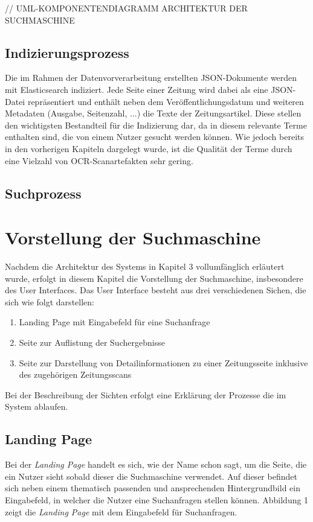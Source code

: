 \documentclass[11pt,a4paper, halfparskip]{scrartcl}
\begin{document}
// UML-KOMPONENTENDIAGRAMM ARCHITEKTUR DER SUCHMASCHINE 

\subsection{Indizierungsprozess}

Die im Rahmen der Datenvorverarbeitung erstellten JSON-Dokumente werden mit Elasticsearch indiziert. 
Jede Seite einer Zeitung wird dabei als eine JSON-Datei repräsentiert und enthält neben dem Veröffentlichungsdatum und weiteren Metadaten (Ausgabe, Seitenzahl, ...) die Texte der Zeitungsartikel.
Diese stellen den wichtigsten Bestandteil für die Indizierung dar, da in diesem relevante Terme enthalten sind, die von einem Nutzer gesucht werden können.
Wie jedoch bereits in den vorherigen Kapiteln dargelegt wurde, ist die Qualität der Terme durch eine Vielzahl von OCR-Scanartefakten sehr gering.

\subsection{Suchprozess}

\section{Vorstellung der Suchmaschine}

Nachdem die Architektur des Systems in Kapitel 3 vollumfänglich erläutert wurde, erfolgt in diesem Kapitel die Vorstellung der Suchmaschine, insbesondere des User Interfaces.
Das User Interface besteht aus drei verschiedenen Sichen, die sich wie folgt darstellen:
	\begin{enumerate}
		\item Landing Page mit Eingabefeld für eine Suchanfrage
		\item Seite zur Auflistung der Suchergebnisse
		\item Seite zur Darstellung von Detailinformationen zu einer Zeitungsseite inklusive des zugehörigen Zeitungsscans  	
	\end{enumerate}
Bei der Beschreibung der Sichten erfolgt eine Erklärung der Prozesse die im System ablaufen.

\subsection{Landing Page}

Bei der \textit{Landing Page} handelt es sich, wie der Name schon sagt, um die Seite, die ein Nutzer sieht sobald dieser die Suchmaschine verwendet.
Auf dieser befindet sich neben einem thematisch passenden und ansprechenden Hintergrundbild ein Eingabefeld, in welcher die Nutzer eine Suchanfragen stellen können. 
Abbildung 1 zeigt die \textit{Landing Page} mit dem Eingabefeld für Suchanfragen.
\end{document}
